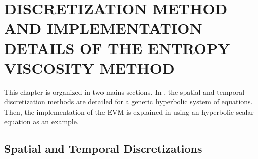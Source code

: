 %
%
%

\chapter{\uppercase {Discretization method and implementation details of the entropy viscosity method}}\label{chap:disc_chap2}
 
This chapter is organized in two mains sections. In , the spatial and temporal discretization methods are detailed for a generic hyperbolic system of equations. Then, the implementation of the EVM is explained in  using an hyperbolic scalar equation as an example. 

\section{Spatial and Temporal Discretizations}\label{sec:disc_sect2}
%
